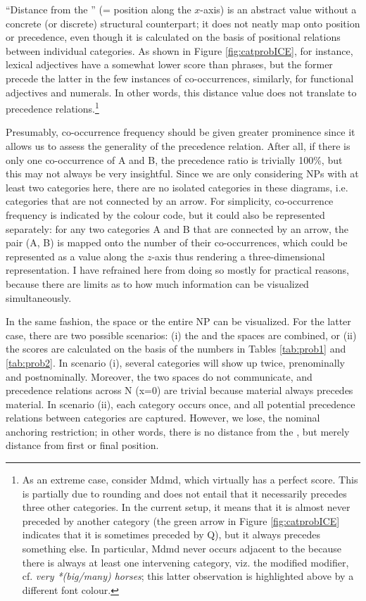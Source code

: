\documentclass[output=paper,colorlinks,citecolor=brown,draft]{langscibook}
\begin{document}
\clearpage
``Distance from the '' (= position along the $x$-axis) is  an abstract value without a concrete (or discrete) structural counterpart; it does not neatly map onto position or precedence, even though it is calculated on the basis of positional relations between individual categories. As shown in Figure \ref{fig:catprobICE}, for instance, lexical adjectives have a somewhat lower score than  phrases, but the former precede the latter in the few instances of co-occurrences, similarly, for functional adjectives and numerals. In other words, this distance value does not translate to precedence relations.\footnote{As an extreme case, consider Mdmd, which virtually has a perfect score. 
This is partially due to rounding and does not entail that it necessarily precedes three other categories. In the current setup, it means that it is almost never preceded by another category (the green arrow in Figure \ref{fig:catprobICE} indicates that it is sometimes preceded by Q), but it always precedes something else. In particular, Mdmd never occurs adjacent to the  because there is always at least one intervening category, viz. the modified modifier, cf. \textit{very *(big/many) horses}; this latter observation is highlighted above by a different font colour. }  

\begin{sloppypar}
Presumably, co-occurrence frequency should be given greater prominence since it allows us to assess the generality of the precedence relation. After all, if there is only one co-occurrence of A and B, the precedence ratio is trivially 100\%, but this may not always be very insightful.  Since we are only considering NPs with at least two  categories here, there are no isolated categories in these diagrams, i.e. categories that are not connected by an arrow. For simplicity, co-occurrence frequency is indicated by the colour code, but it could also be represented separately: for any two categories A and B that are connected by an arrow, the pair (A, B) is mapped onto the number of their co-occurrences, which could be represented as a value along the $z$-axis thus rendering a three-dimensional representation. I have refrained here from doing so mostly for practical reasons, because there are limits as to how much information can be visualized simultaneously. 
\end{sloppypar}

In the same fashion, the  space or the entire NP can be visualized. For the latter case, there are two possible scenarios: (i) the  and the  spaces are combined, or (ii) the scores are calculated on the basis of the numbers in Tables \ref{tab:prob1} and \ref{tab:prob2}. In scenario (i), several categories will show up twice, prenominally and postnominally. Moreover, the two spaces do not communicate, and precedence relations across N (x=0) are trivial because  material always precedes  material. In scenario (ii), each category occurs once, and all potential precedence relations between categories are captured. However, we lose, the nominal anchoring restriction; in other words, there is no distance from the , but merely distance from first or final position. 
\end{document}
